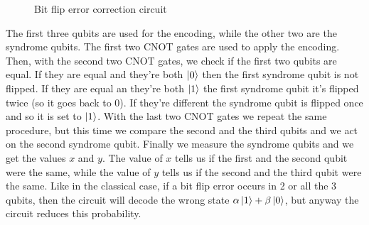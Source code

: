 \documentclass{article}
\begin{document}
	\begin{figure}[H]
	\centering
	\caption{Bit flip error correction circuit}
	\end{figure}
	\noindent The first three qubits are used for the encoding, while the other two are the syndrome qubits. The first two CNOT gates are used to apply the encoding. Then, with the second two CNOT gates, we check if the first two qubits are equal. If they are equal and they're both $\ket{0}$ then the first syndrome qubit is not flipped. If they are equal an they're both $\ket{1}$ the first syndrome qubit it's flipped twice (so it goes back to 0). If they're different the syndrome qubit is flipped once and so it is set to $\ket{1}$. With the last two CNOT gates we repeat the same procedure, but this time we compare the second and the third qubits and we act on the second syndrome qubit. Finally we measure the syndrome qubits and we get the values $x$ and $y$. The value of $x$ tells us if the first and the second qubit were the same, while the value of $y$ tells us if the second and the third qubit were the same. Like in the classical case, if a bit flip error occurs in 2 or all the 3 qubits, then the circuit will decode the wrong state $\alpha\ket{1} + \beta\ket{0}$, but anyway the circuit reduces this probability. 
\end{document}
